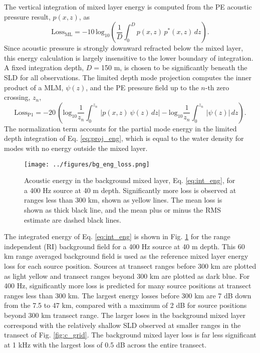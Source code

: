 \documentclass[preprint,NumberedRefs]{JASA}
\begin{document}
The vertical integration of mixed layer energy is computed from the PE acoustic pressure result, $p(x, z)$, as
\begin{equation}
    \textrm{Loss}_{\textrm{ML}} = -10 \, \textrm{log}_{10} \left( \frac{1}{D} \int^{D}_0 p(x, z) \, p^* (x, z) \,  dz \right).
    \label{eq:int_eng}
\end{equation}
Since acoustic pressure is strongly downward refracted below the mixed layer, this energy calculation is largely insensitive to the lower boundary of integration. A fixed integration depth, $D=$150 m, is chosen to be significantly beneath the SLD for all observations. The limited depth mode projection computes the inner product of a MLM, $\psi(z)$, and the PE pressure field up to the $n$-th zero crossing, $z_n$,
\begin{equation}
    \textrm{Loss}_{\textrm{P1}} = -20 \, \left( \textrm{log}_{10} \frac{1}{z_n} \int^{z_n}_0 \, \left| p(x, z) \ \psi(z) \,  dz \right| - \textrm{log}_{10} \frac{1}{z_n} \int^{z_n}_0 \, \left| \psi(z) \right| \,  dz \right).
    \label{eq:proj_eng}
\end{equation}
The normalization term accounts for the partial mode energy in the limited depth integration of Eq. \eqref{eq:proj_eng}, which is equal to the water density for modes with no energy outside the mixed layer\citep{jensen2011computational}.

\begin{figure}
\texttt{[image: ../figures/bg\_eng\_loss.png]}
    \caption{Acoustic energy in the background mixed layer, Eq. \eqref{eq:int_eng}, for a 400 Hz source at 40 m depth. Significantly more loss is observed at ranges less than 300 km, shown as yellow lines. The mean loss is shown as thick black line, and the mean plus or minus the RMS estimate are dashed black lines.}
    \label{fig:bg_eng}
\end{figure}
The integrated energy of Eq. \eqref{eq:int_eng} is shown in Fig. \ref{fig:bg_eng} for the range independent (RI) background field for a 400 Hz source at 40 m depth. This 60 km range averaged background field is used as the reference mixed layer energy loss for each source position. Sources at transect ranges before 300 km are plotted as light yellow and transect ranges beyond 300 km are plotted as dark blue. For 400 Hz, significantly more loss is predicted for many source positions at transect ranges less than 300 km. The largest energy losses before 300 km are 7 dB down from the 7.5 to 47 km, compared with a maximum of 2 dB for source positions beyond 300 km transect range. The larger loses in the background mixed layer correspond with the relatively shallow SLD observed at smaller ranges in the transect of Fig. \ref{fig:c_grid}. The background mixed layer loss is far less significant at 1 kHz with the largest loss of 0.5 dB across the entire transect.
\end{document}
